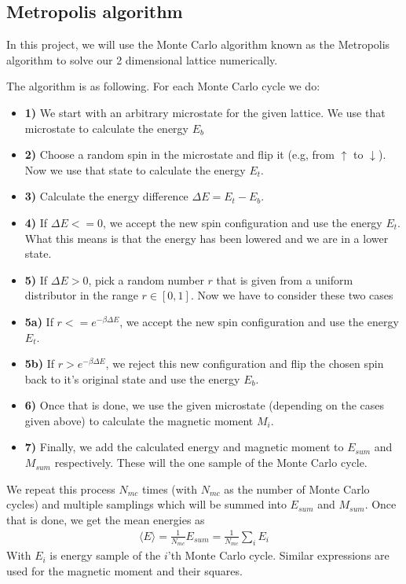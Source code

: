 \documentclass[12pt]{article}
\begin{document}
\subsection{Metropolis algorithm}
In this project, we will use the Monte Carlo algorithm known as the Metropolis algorithm to solve our 2 dimensional lattice numerically. 

The algorithm is as following. For each Monte Carlo cycle we do:
\begin{itemize}
\item \textbf{1)} We start with an arbitrary microstate for the given lattice. We use that microstate to calculate the energy $E_b$
\item \textbf{2)} Choose a random spin in the microstate and flip it (e.g, from $\uparrow$ to $\downarrow$). Now we use that state to calculate the energy $E_t$.
\item \textbf{3)} Calculate the energy difference $\Delta E = E_t - E_b$. 
\item \textbf{4)} If $\Delta E <= 0$, we accept the new spin configuration and use the energy $E_t$. What this means is that the energy has been lowered and we are in a lower state.
\item \textbf{5)} If $ \Delta E > 0$, pick a random number $r$ that is given from a uniform distributor in the range $r \in [0,1]$. Now we have to consider these two cases
\item \textbf{5a)} If $r <= e^{-\beta \Delta E}$, we accept the new spin configuration and use the energy $E_t$.
\item \textbf{5b)} If $ r > e^{-\beta \Delta E}$, we reject this new configuration and flip the chosen spin back to it's original state and use the energy $E_b$.
\item \textbf{6)} Once that is done, we use the given microstate (depending on the cases given above) to calculate the magnetic moment $M_i$.
\item \textbf{7)} Finally, we add the calculated energy and magnetic moment to $E_{sum}$ and $M_{sum}$ respectively. These will the one sample of the Monte Carlo cycle.
\end{itemize}
We repeat this process $N_{mc}$ times (with $N_{mc}$ as the number of Monte Carlo cycles) and multiple samplings which will be summed into $E_{sum}$ and $M_{sum}$. Once that is done, we get the mean energies as
\begin{align*}
\langle E \rangle = \frac{1}{N_{mc}}E_{sum} = \frac{1}{N_{mc}}\displaystyle \sum_i E_i
\end{align*}
With $E_i$ is energy sample of the $i$'th Monte Carlo cycle. Similar expressions are used for the magnetic moment and their squares.
\end{document}
